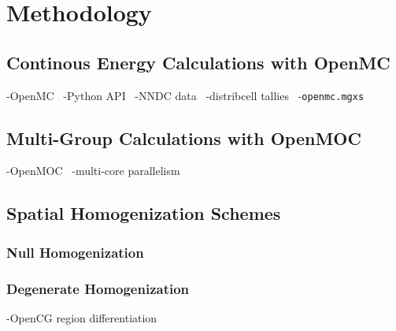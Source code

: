 \section{Methodology}
\label{sec:methodology}

\subsection{Continous Energy Calculations with OpenMC}
\label{subsec:openmc}

-OpenMC~\cite{romano2013openmc}
-Python API~\cite{boyd2016bigdata}
-NNDC data~\cite{nndc2016endf}
-distribcell tallies~\cite{lax2014distribcell}
-\texttt{openmc.mgxs}

\subsection{Multi-Group Calculations with OpenMOC}
\label{subsec:openmoc}

-OpenMOC~\cite{boyd2014openmoc}
-multi-core parallelism~\cite{boyd2016parallel}


\subsection{Spatial Homogenization Schemes}
\label{subsec:homogenize}

\subsubsection{Null Homogenization}
\label{subsubsec:homogenize-null}

\subsubsection{Degenerate Homogenization}
\label{subsubsec:homogenize-degenerate}

-OpenCG region differentiation~\cite{boyd2015opencg}

